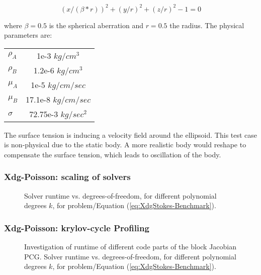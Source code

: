\begin{equation}
(x/(\beta*r))^2 + (y/r)^2 +(z/r)^2-1=0
\end{equation} 

where $\beta=0.5$ is the spherical aberration and $r=0.5$ the radius. The physical parameters are:

\begin{table}[h]
	\centering
	\begin{tabular}{l|c}
		$\rho_A$ & 1e-3  $kg / cm^3$\\
		$\rho_B$ & 1.2e-6  $kg / cm^3$\\
		$\mu_A$ & 1e-5 $kg / cm / sec$\\
		$\mu_B$ & 17.1e-8 $kg / cm / sec$\\
		$\sigma$ & 72.75e-3 $kg / sec^2$\\
	\end{tabular}
\end{table}

The surface tension is inducing a velocity field around the ellipsoid. This test case is non-physical due to the static body. A more realistic body would reshape to compensate the surface tension, which leads to oscillation of the body.

\graphicspath{{./apdx-NodeSolverPerformance/XDGStokes/plots/}}

\subsubsection{Xdg-Poisson: scaling of solvers}

\begin{figure}[!h]
	\begin{center}
		
	\end{center}
	\caption{
		Solver runtime vs. degrees-of-freedom, for different polynomial degrees $k$,
		for problem/Equation (\ref{eq:XdgStokes-Benchmark}).
	}
	\label{fig:XdgStokes-scaling}
\end{figure}
\newpage

\subsubsection{Xdg-Poisson: krylov-cycle Profiling}


\begin{figure}[!h]
	\begin{center}
		
	\end{center}
	\caption{
		Investigation of runtime of different code parts of the block Jacobian PCG. Solver runtime vs. degrees-of-freedom, for different polynomial degrees $k$,
		for problem/Equation (\ref{eq:XdgStokes-Benchmark}).
	}
	\label{fig:XdgStokes-kcylce}
\end{figure}


